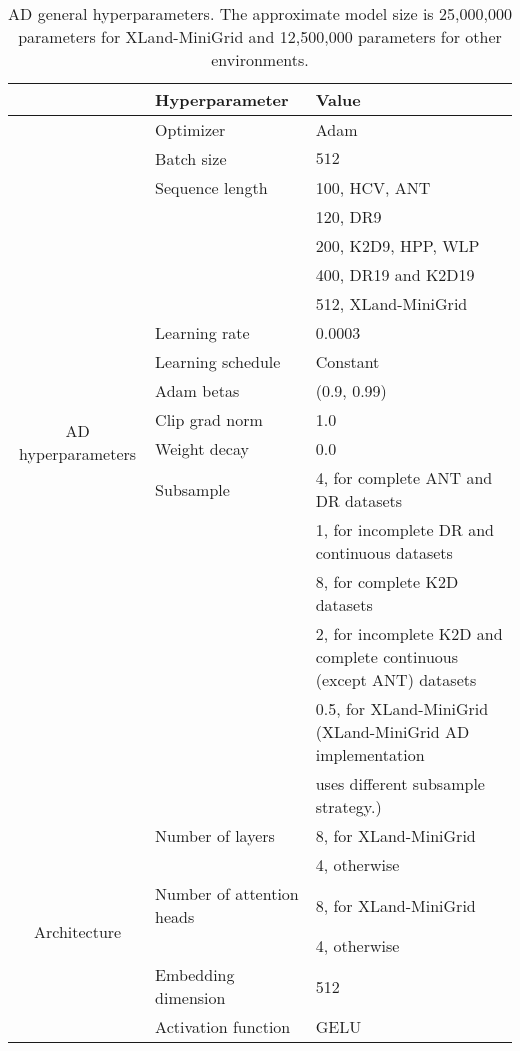 \begin{table}[ht]
\centering
\caption{AD general hyperparameters. The approximate model size is 25,000,000 parameters for XLand-MiniGrid and 12,500,000 parameters for other environments.}
\begin{tabular}{cll}
\toprule
& Hyperparameter & Value \\
\midrule
\multirow{17}{*}{AD hyperparameters}
& Optimizer & Adam~\citep{kingma2014adam} \\
&Batch size   & $512$ \\
&Sequence length &  100, HCV, ANT \\
& &  120, DR9 \\
&& 200, K2D9, HPP, WLP\\
&& 400, DR19 and K2D19\\
&& 512, XLand-MiniGrid\\
&Learning rate & 0.0003 \\
&Learning schedule & Constant \\
&Adam betas & (0.9, 0.99) \\
&Clip grad norm & 1.0 \\
&Weight decay & 0.0 \\
&Subsample   & 4, for complete ANT and DR datasets\\
&& 1, for incomplete DR and continuous datasets\\
&& 8, for complete K2D datasets\\
&& 2, for incomplete K2D and complete continuous (except ANT) datasets\\
&& 0.5, for XLand-MiniGrid (XLand-MiniGrid AD implementation \\ && uses different subsample strategy.)\\
\midrule
\multirow{6}{*}{Architecture}         & Number of layers & 8, for XLand-MiniGrid\\ 
&& 4, otherwise  \\
&Number of attention heads    & 8, for XLand-MiniGrid\\
&& 4, otherwise  \\
&Embedding dimension    & 512  \\ 
&Activation function & GELU\\
\bottomrule
\end{tabular}
\vspace{6pt}
\label{table:ad_hyp}
\end{table}
